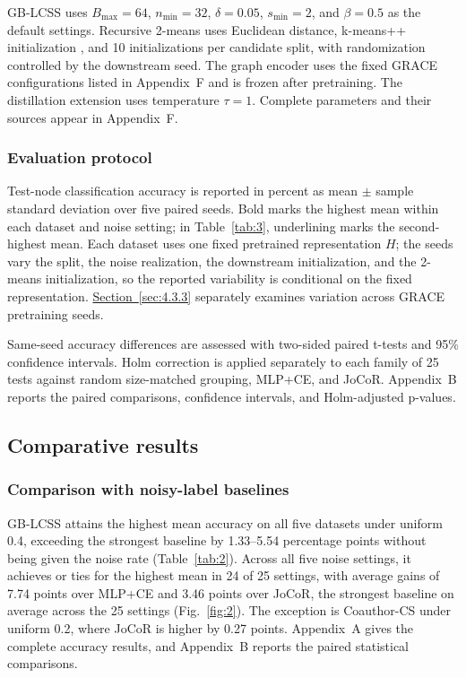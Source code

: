 \documentclass[10pt,letterpaper,nopreprintline]{elsarticle}
\theoremstyle{plain}
\begin{document}
GB-LCSS uses \(B_{\max} = 64\), \(n_{\min} = 32\), \(\delta = 0.05\), \(s_{\min} = 2\), and \(\beta = 0.5\) as the default settings. Recursive 2-means uses Euclidean distance, k-means++ initialization \cite{ref71}, and 10 initializations per candidate split, with randomization controlled by the downstream seed. The graph encoder uses the fixed GRACE configurations listed in Appendix~F and is frozen after pretraining. The distillation extension uses temperature \(\tau = 1\). Complete parameters and their sources appear in Appendix~F.



\subsubsection{Evaluation protocol}\label{sec:4.1.5}

Test-node classification accuracy is reported in percent as mean \ensuremath{\pm} sample standard deviation over five paired seeds. Bold marks the highest mean within each dataset and noise setting; in Table~\ref{tab:3}, underlining marks the second-highest mean. Each dataset uses one fixed pretrained representation \(H\); the seeds vary the split, the noise realization, the downstream initialization, and the 2-means initialization, so the reported variability is conditional on the fixed representation. \hyperref[sec:4.3.3]{Section~\ref*{sec:4.3.3}} separately examines variation across GRACE pretraining seeds.

Same-seed accuracy differences are assessed with two-sided paired t-tests and 95\% confidence intervals. Holm correction \cite{ref72} is applied separately to each family of 25 tests against random size-matched grouping, MLP+CE, and JoCoR. Appendix~B reports the paired comparisons, confidence intervals, and Holm-adjusted p-values.

\subsection{Comparative results}\label{sec:4.2}

\subsubsection{Comparison with noisy-label baselines}\label{sec:4.2.1}



GB-LCSS attains the highest mean accuracy on all five datasets under uniform 0.4, exceeding the strongest baseline by 1.33--5.54 percentage points without being given the noise rate (Table~\ref{tab:2}). Across all five noise settings, it achieves or ties for the highest mean in 24 of 25 settings, with average gains of 7.74 points over MLP+CE and 3.46 points over JoCoR, the strongest baseline on average across the 25 settings (Fig.~\ref{fig:2}). The exception is Coauthor-CS under uniform 0.2, where JoCoR is higher by 0.27 points. Appendix~A gives the complete accuracy results, and Appendix~B reports the paired statistical comparisons.
\end{document}
